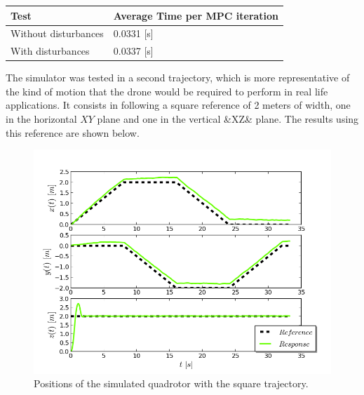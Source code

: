 \begin{center}
    \begin{tabular}{| l | l |}
    \hline
    \textbf{Test} & \textbf{Average Time per MPC iteration} \\ \hline
    Without disturbances & 0.0331 [s]\\ \hline
    With disturbances &  0.0337 [s] \\
    \hline
    \end{tabular}
\end{center}

The simulator was tested in a second trajectory, which is more representative of the kind of motion that the drone would be required to perform in real life applications. It consists in following a square reference of 2 meters of width, one in the horizontal $XY$ plane and one in the vertical &XZ& plane.  The results using this reference are shown below.

\begin{figure}[H]
\centering
\includegraphics[scale=0.7]{Images/Chapter5/ardrone/T2/position.png}
\caption{Positions of the simulated quadrotor with the square trajectory.}
\label{fig:ardrone_sq_pos}
\end{figure}


